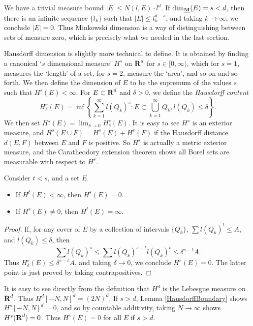 \begin{remark}
	We have a trivial measure bound $|E| \leq N(l,E) \cdot l^d$. If $\operatorname{\dim_{\underline{\mathbf{M}}}}(E) = s < d$, then there is an infinite sequence $\{ l_k \}$ such that $|E| \leq l_k^{d-s}$, and taking $k \to \infty$, we conclude $|E| = 0$. Thus Minkowski dimension is a way of distinguishing between sets of measure zero, which is precisely what we needed in the last section.
\end{remark}

Hausdorff dimension is slightly more technical to define. It is obtained by finding a canonical `$s$ dimensional measure' $H^s$ on $\operatorname{\mathbf{R}}^d$ for $s \in [0,\infty)$, which for $s = 1$, measures the `length' of a set, for $s = 2$, measure the `area', and so on and so forth. We then define the dimension of $E$ to be the supremum of the values $s$ such that $H^s(E) < \infty$. For $E \subset \operatorname{\mathbf{R}}^d$ and $\delta > 0$, we define the \emph{Hausdorff content}
%
\[ H_\delta^s(E) = \inf \left\{ \sum_{k = 1}^\infty l(Q_k)^s : E \subset \bigcup_{k = 1}^\infty Q_k, l(Q_k) \leq \delta \right\}. \]
%
We then set $H^s(E) = \lim_{\delta \to 0} H_\delta^s(E)$. It is easy to see $H^s$ is an exterior measure, and $H^s(E \cup F) = H^s(E) + H^s(F)$ if the Hausdorff distance $d(E,F)$ between $E$ and $F$ is positive. So $H^s$ is actually a metric exterior measure, and the Caratheodory extension theorem shows all Borel sets are measurable with respect to $H^s$.

\begin{lemma} \label{HausdorffBoundary}
	Consider $t < s$, and a set $E$.
	\begin{itemize}
		\item If $H^t(E) < \infty$, then $H^s(E) = 0$.
		\item If $H^s(E) \neq 0$, then $H^t(E) = \infty$.
	\end{itemize}
\end{lemma}
\begin{proof}
	If, for any cover of $E$ by a collection of intervals $\{ Q_k \}$, $\sum l(Q_k)^t \leq A$, and $l(Q_k) \leq \delta$, then
	\[ \sum l(Q_k)^s \leq \sum l(Q_k)^{s-t} l(Q_k)^t \leq \delta^{s-t} A. \]
	Thus $H^s_\delta(E) \leq \delta^{s-t} A$, and taking $\delta \to 0$, we conclude $H^s(E) = 0$. The latter point is just proved by taking contrapositives.
\end{proof}

\begin{remark}
	It is easy to see directly from the definition that $H^d$ is the Lebesgue measure on $\operatorname{\mathbf{R}}^d$. Thus $H^d[-N,N]^d = (2N)^d$. If $s > d$, Lemma \ref{HausdorffBoundary} shows $H^s[-N,N]^d = 0$, and so by countable additivity, taking $N \to \infty$ shows $H^s(\operatorname{\mathbf{R}}^d) = 0$. Thus $H^s(E) = 0$ for all $E$ if $s > d$.
\end{remark}

